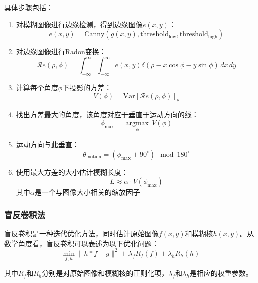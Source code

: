 \documentclass[a4paper,11pt,UTF8]{ctexart}
\begin{document}
具体步骤包括：
\begin{enumerate}
    \item 对模糊图像进行边缘检测，得到边缘图像$e(x,y)$：
    \begin{equation}
    e(x,y) = \text{Canny}(g(x,y), \text{threshold}_{\text{low}}, \text{threshold}_{\text{high}})
    \end{equation}
    \item 对边缘图像进行Radon变换：
    \begin{equation}
    \mathcal{R}e(\rho, \phi) = \int_{-\infty}^{\infty}\int_{-\infty}^{\infty} e(x,y) \delta(\rho - x\cos\phi - y\sin\phi) \, dx \, dy
    \end{equation}
    \item 计算每个角度$\phi$下投影的方差：
    \begin{equation}
    V(\phi) = \text{Var}[\mathcal{R}e(\rho, \phi)]_{\rho}
    \end{equation}
    \item 找出方差最大的角度，该角度对应于垂直于运动方向的线：
    \begin{equation}
    \phi_{\text{max}} = \underset{\phi}{\operatorname{argmax}} \, V(\phi)
    \end{equation}
    \item 运动方向与此垂直：
    \begin{equation}
    \theta_{\text{motion}} = (\phi_{\text{max}} + 90^\circ) \mod 180^\circ
    \end{equation}
    \item 使用最大方差的大小估计模糊长度：
    \begin{equation}
    L \approx \alpha \cdot V(\phi_{\text{max}})
    \end{equation}
    其中$\alpha$是一个与图像大小相关的缩放因子
\end{enumerate}

\subsubsection{盲反卷积法}
盲反卷积是一种迭代优化方法，同时估计原始图像$f(x,y)$和模糊核$h(x,y)$。从数学角度看，盲反卷积可以表述为以下优化问题：
\begin{equation}
\min_{f,h} \|h * f - g\|^2 + \lambda_f R_f(f) + \lambda_h R_h(h)
\end{equation}

其中$R_f$和$R_h$分别是对原始图像和模糊核的正则化项，$\lambda_f$和$\lambda_h$是相应的权重参数。
\end{document}
